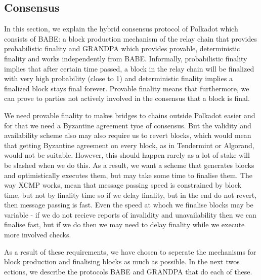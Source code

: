 \subsection{Consensus}\label{sec:consensus}

In this section, we explain the hybrid consensus protocol of Polkadot which consists of BABE: a block production mechanism of the relay chain that provides probabilistic finality and GRANDPA which provides provable, deterministic finality and works independently from BABE.  Informally, probabilistic finality implies that after certain time passed, a block in the relay chain will be finalized with very high probability (close to 1) and deterministic finality implies a finalized block stays final forever. Provable finality means that furthermore, we can prove to parties not actively involved in the consensus that a block is final.

We need provable finality to makes bridges to chains outside Polkadot easier and for that we need a Byzantine agreement tyoe of consensus. But the validity and availability scheme also may also require us to revert blocks, which would mean that getting Byzantine agreement on every block, as in Tendermint or Algorand, would not be suitable. However, this should happen rarely as a lot of stake will be slashed when we do this. As a result, we want a scheme that generates blocks and optimistically executes them, but may take some time to finalise them. The way XCMP works, mean that message passing speed is constrained by block time, but not by finality time so if we delay finality, but in the end do not revert, then message passing is fast. Even the speed at whoch we finalise blocks may be variable - if we do not recieve reports of invalidity and unavailability then we can finalise fast, but if we do then we may need to delay finality while we execute more involved checks.

As a result of these requirements, we have chosen to seperate the mechanisms for block production and finalising blocks as much as possible. In the next twos ections, we describe the protocols BABE and GRANDPA that do each of these.




